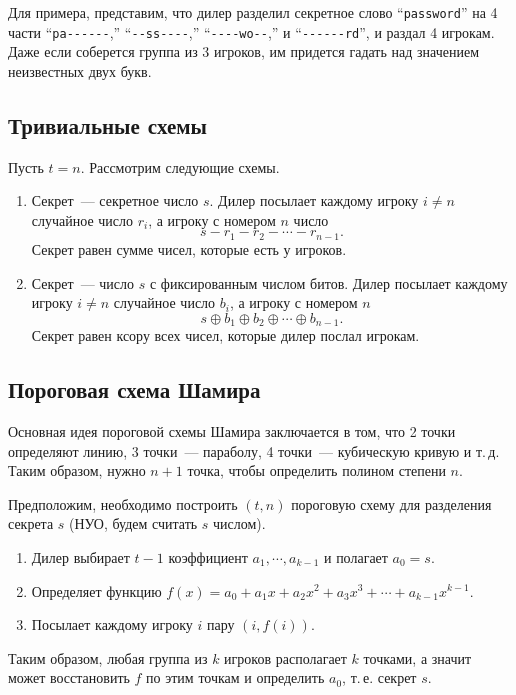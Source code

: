 \documentclass[a4paper,10pt]{article}
\begin{document}
Для примера, представим, что дилер разделил секретное слово ``\texttt{password}'' 
на 4 части ``\texttt{pa-{-}-{-}-{-}},'' ``\texttt{-{-}ss-{-}-{-}},'' ``\texttt{-{-}-{-}wo-{-}},'' и
``\texttt{-{-}-{-}-{-}rd}'', и раздал 4 игрокам.
Даже если соберется группа из 3 игроков, им придется гадать над значением неизвестных двух букв.

\subsection{Тривиальные схемы}
Пусть $t = n$. 
Рассмотрим следующие схемы.

\begin{enumerate}
    \item Секрет~--- секретное число $s$.
        Дилер посылает каждому игроку $i\neq n$ случайное число $r_i$, а игроку с номером $n$
        число $$s - r_1 - r_2 - \cdots - r_{n - 1}.$$
        Секрет равен сумме чисел, которые есть у игроков.

    \item Секрет~--- число $s$ с фиксированным числом битов.
        Дилер посылает каждому игроку $i\neq n$ случайное число $b_i$, а игроку
        с номером $n$ $$s\oplus b_1\oplus b_2 \oplus\cdots \oplus b_{n-1}.$$
        Секрет равен ксору всех чисел, которые дилер послал игрокам.
\end{enumerate}

\subsection{Пороговая схема Шамира}
Основная идея пороговой схемы Шамира заключается в том, что 2 точки определяют линию,
3 точки~--- параболу, 4 точки~--- кубическую кривую и т.\,д.
Таким образом, нужно $n+1$ точка, чтобы определить полином степени $n$.

Предположим, необходимо построить $(t,n)$ пороговую схему для разделения секрета $s$ (НУО, будем
считать $s$ числом).

\begin{enumerate}
    \item Дилер выбирает $t-1$ коэффициент $a_1,\cdots, a_{k-1}$ и полагает $a_0 = s$.
    \item Определяет функцию $f(x)=a_0+a_1x+a_2x^2+a_3x^3+\cdots+a_{k-1}x^{k-1}$.
    \item Посылает каждому игроку $i$ пару $(i, f(i))$.
\end{enumerate}
Таким образом, любая группа из $k$ игроков располагает $k$ точками, 
а значит может восстановить $f$ по этим точкам и определить $a_0$, т.\,е. секрет $s$.
\end{document}
